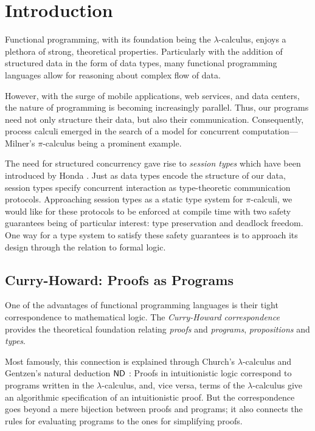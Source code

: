 \chapter{Introduction}\label{ch:introduction}

Functional programming, with its foundation being the $\lambda$-calculus,
enjoys a plethora of strong, theoretical properties. Particularly with
the addition of structured data in the form of data types, many functional programming
languages allow for reasoning about complex flow of data.

However, with the surge of mobile applications, web services, and data centers,
the nature of programming is becoming increasingly parallel. Thus, our programs
need not only structure their data, but also their communication.
Consequently, process calculi emerged in the search of a model for concurrent
computation---Milner's $\pi$-cal\-cu\-lus \cite{Milner1992:PiCalculus} being a prominent example.

The need for structured concurrency gave rise to \emph{session types}
which have been introduced by Honda \cite{Honda1993:TypesForDyadicInteraction}.
Just as data types encode the structure
of our data, session types specify concurrent interaction as type-theoretic
communication protocols. Approaching session types as a static type system for $\pi$-calculi,
we would like for these protocols to be enforced at compile time with
two safety guarantees being of particular interest: type preservation and
deadlock freedom. One way for a type system to satisfy these safety guarantees
is to approach its design through the relation to formal logic.

\section{Curry-Howard: Proofs as Programs}
One of the advantages of functional programming languages is their tight correspondence
to mathematical logic. The \emph{Curry-Howard correspondence} \cite{Curry1959-CombinatoryLogic, Howard1980-FormulasAsTypes}
provides the theoretical foundation relating \emph{proofs} and \emph{programs},
\emph{propositions} and \emph{types}.

Most famously, this connection is explained
through Church's $\lambda$-calculus \cite{Church1932:LambdaCalc} and
Gentzen's natural deduction $\textsf{ND}$ \cite{Gentzen1935:Untersuchungen1}:
Proofs in intuitionistic logic correspond to programs written in the $\lambda$-calculus,
and, vice versa, terms of the $\lambda$-calculus give an algorithmic specification
of an intuitionistic proof. But the correspondence goes beyond a mere bijection
between proofs and programs; it also connects the rules for evaluating programs
to the ones for simplifying proofs.

